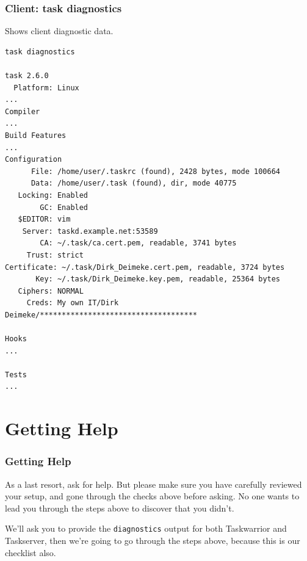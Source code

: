 \documentclass[t,handout]{beamer}
\begin{document}
\begin{frame}[fragile]\frametitle{Client: task diagnostics}\label{C4}
    \vfill
    Shows client diagnostic data.

    \begin{lstlisting}
task diagnostics

task 2.6.0
  Platform: Linux
...
Compiler
...
Build Features
...
Configuration
      File: /home/user/.taskrc (found), 2428 bytes, mode 100664
      Data: /home/user/.task (found), dir, mode 40775
   Locking: Enabled
        GC: Enabled
   $EDITOR: vim
    Server: taskd.example.net:53589
        CA: ~/.task/ca.cert.pem, readable, 3741 bytes
     Trust: strict
Certificate: ~/.task/Dirk_Deimeke.cert.pem, readable, 3724 bytes
       Key: ~/.task/Dirk_Deimeke.key.pem, readable, 25364 bytes
   Ciphers: NORMAL
     Creds: My own IT/Dirk Deimeke/************************************

Hooks
...

Tests
...\end{lstlisting}
\end{frame}

\section{Getting Help}

\begin{frame}[fragile]\frametitle{Getting Help}
    \vfill
    As a last resort, ask for help. But please make sure you have carefully reviewed your setup, and gone through the checks above before asking. No one wants to lead you through the steps above to discover that you didn't.

    We'll ask you to provide the \verb+diagnostics+ output for both Taskwarrior and Taskserver, then we're going to go through the steps above, because this is our checklist also.
\end{frame}
\end{document}
